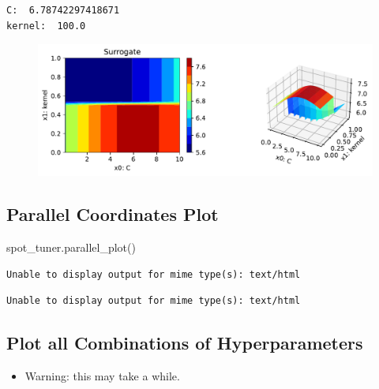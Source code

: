 \documentclass[
  letterpaper,
  DIV=11,
  numbers=noendperiod]{scrreprt}
\newenvironment{Shaded}{\begin{snugshade}}{\end{snugshade}}
\newcommand{\NormalTok}[1]{\textcolor[rgb]{0.00,0.23,0.31}{#1}}
\providecommand{\tightlist}{%
  \setlength{\itemsep}{0pt}\setlength{\parskip}{0pt}}\usepackage{longtable,booktabs,array}
\begin{document}
\begin{verbatim}
C:  6.78742297418671
kernel:  100.0
\end{verbatim}

\begin{figure}[H]

{\centering \includegraphics{10_spot_hpt_sklearn_classification_files/figure-pdf/cell-34-output-2.pdf}

}

\end{figure}

\hypertarget{parallel-coordinates-plot}{%
\subsection{Parallel Coordinates Plot}\label{parallel-coordinates-plot}}

\begin{Shaded}
\begin{Highlighting}[]
\NormalTok{spot\_tuner.parallel\_plot()}
\end{Highlighting}
\end{Shaded}

\begin{verbatim}
Unable to display output for mime type(s): text/html
\end{verbatim}

\begin{verbatim}
Unable to display output for mime type(s): text/html
\end{verbatim}

\hypertarget{plot-all-combinations-of-hyperparameters}{%
\subsection{Plot all Combinations of
Hyperparameters}\label{plot-all-combinations-of-hyperparameters}}

\begin{itemize}
\tightlist
\item
  Warning: this may take a while.
\end{itemize}
\end{document}
